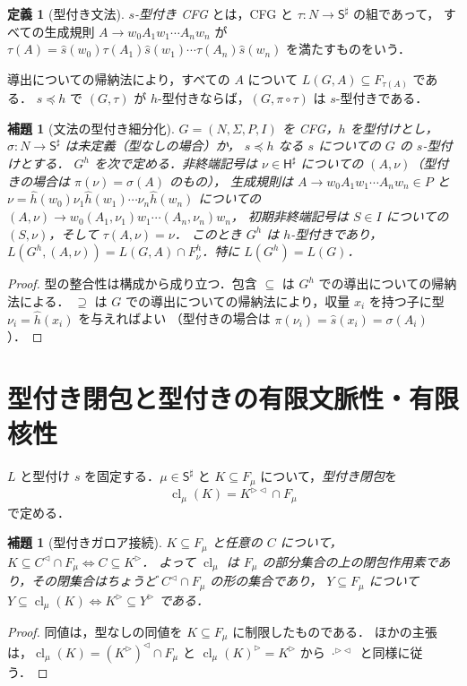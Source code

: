 \documentclass[11pt,a4paper]{ltjsarticle}
\numberwithin{equation}{section}
\theoremstyle{plain}
\newtheorem{lemma}[theorem]{補題}
\theoremstyle{definition}
\newtheorem{definition}[theorem]{定義}
\theoremstyle{remark}
\theoremstyle{plain}
\newcommand{\R}{^{\rhd}}
\newcommand{\Lc}{^{\lhd}}
\newcommand{\RL}{^{\rhd\lhd}}
\newcommand{\cl}{\operatorname{cl}}
\begin{document}
\begin{definition}[型付き文法]\label{def:typed}
\emph{$s$-型付き CFG} とは，CFG と $\tau:N\to\mathsf S^\sharp$ の組であって，
すべての生成規則 $A\to w_0A_1w_1\cdots A_nw_n$ が
$\tau(A)=\widehat s(w_0)\tau(A_1)\widehat s(w_1)\cdots\tau(A_n)\widehat s(w_n)$ を満たすものをいう．
\end{definition}
導出についての帰納法により，すべての $A$ について $L(G,A)\subseteq F_{\tau(A)}$ である．
$s\preceq h$ で $(G,\tau)$ が $h$-型付きならば，$(G,\pi\circ\tau)$ は $s$-型付きである．

\begin{lemma}[文法の型付き細分化]\label{lem:product}
$G=(N,\Sigma,P,I)$ を CFG，$h$ を型付けとし，$\sigma:N\to\mathsf S^\sharp$ は未定義（型なしの場合）か，
$s\preceq h$ なる $s$ についての $G$ の $s$-型付けとする．
$G^h$ を次で定める．非終端記号は $\nu\in\mathsf H^\sharp$ についての $(A,\nu)$（型付きの場合は $\pi(\nu)=\sigma(A)$ のもの），
生成規則は $A\to w_0A_1w_1\cdots A_nw_n\in P$ と
$\nu=\widehat h(w_0)\nu_1\widehat h(w_1)\cdots\nu_n\widehat h(w_n)$ についての
$(A,\nu)\to w_0(A_1,\nu_1)w_1\cdots(A_n,\nu_n)w_n$，
初期非終端記号は $S\in I$ についての $(S,\nu)$，そして $\tau(A,\nu)=\nu$．
このとき $G^h$ は $h$-型付きであり，$L(G^h,(A,\nu))=L(G,A)\cap F^h_\nu$．特に $L(G^h)=L(G)$．
\end{lemma}
\begin{proof}
型の整合性は構成から成り立つ．包含 $\subseteq$ は $G^h$ での導出についての帰納法による．
$\supseteq$ は $G$ での導出についての帰納法により，収量 $x_i$ を持つ子に型 $\nu_i=\widehat h(x_i)$ を与えればよい
（型付きの場合は $\pi(\nu_i)=\widehat s(x_i)=\sigma(A_i)$）．
\end{proof}

\section{型付き閉包と型付きの有限文脈性・有限核性}
\label{sec:typed}

$L$ と型付け $s$ を固定する．$\mu\in\mathsf S^\sharp$ と $K\subseteq F_\mu$ について，\emph{型付き閉包}を
\[
\cl_\mu(K)=K\RL\cap F_\mu
\]
で定める．

\begin{lemma}[型付きガロア接続]\label{lem:typed-galois}
$K\subseteq F_\mu$ と任意の $C$ について，$K\subseteq C\Lc\cap F_\mu\iff C\subseteq K\R$．
よって $\cl_\mu$ は $F_\mu$ の部分集合の上の閉包作用素であり，その閉集合はちょうど $C\Lc\cap F_\mu$ の形の集合であり，
$Y\subseteq F_\mu$ について $Y\subseteq\cl_\mu(K)\iff K\R\subseteq Y\R$ である．
\end{lemma}
\begin{proof}
同値は，型なしの同値を $K\subseteq F_\mu$ に制限したものである．
ほかの主張は，$\cl_\mu(K)=(K\R)\Lc\cap F_\mu$ と $\cl_\mu(K)\R=K\R$ から $\cdot\RL$ と同様に従う．
\end{proof}
\end{document}
